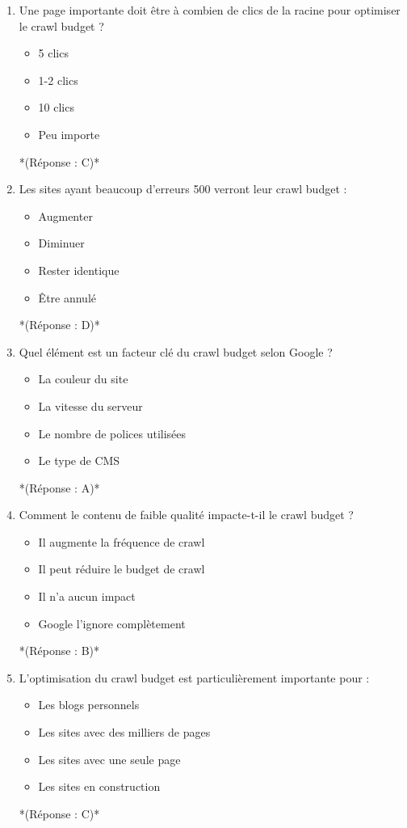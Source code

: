 \documentclass[12pt,a4paper,twoside]{report}
\begin{document}
\begin{enumerate}
\item Une page importante doit être à combien de clics de la racine pour optimiser le crawl budget ?
\begin{itemize}
\item[A)] 5 clics
\item[B)] 1-2 clics
\item[C)] 10 clics
\item[D)] Peu importe
\end{itemize}
*(Réponse : C)*

\item Les sites ayant beaucoup d'erreurs 500 verront leur crawl budget :
\begin{itemize}
\item[A)] Augmenter
\item[B)] Diminuer
\item[C)] Rester identique
\item[D)] Être annulé
\end{itemize}
*(Réponse : D)*

\item Quel élément est un facteur clé du crawl budget selon Google ?
\begin{itemize}
\item[A)] La couleur du site
\item[B)] La vitesse du serveur
\item[C)] Le nombre de polices utilisées
\item[D)] Le type de CMS
\end{itemize}
*(Réponse : A)*

\item Comment le contenu de faible qualité impacte-t-il le crawl budget ?
\begin{itemize}
\item[A)] Il augmente la fréquence de crawl
\item[B)] Il peut réduire le budget de crawl
\item[C)] Il n'a aucun impact
\item[D)] Google l'ignore complètement
\end{itemize}
*(Réponse : B)*

\item L'optimisation du crawl budget est particulièrement importante pour :
\begin{itemize}
\item[A)] Les blogs personnels
\item[B)] Les sites avec des milliers de pages
\item[C)] Les sites avec une seule page
\item[D)] Les sites en construction
\end{itemize}
*(Réponse : C)*


\end{enumerate}
\end{document}
